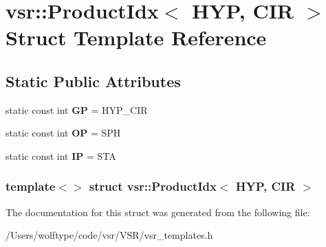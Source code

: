 \hypertarget{structvsr_1_1_product_idx_3_01_h_y_p_00_01_c_i_r_01_4}{\section{vsr\-:\-:Product\-Idx$<$ H\-Y\-P, C\-I\-R $>$ Struct Template Reference}
\label{structvsr_1_1_product_idx_3_01_h_y_p_00_01_c_i_r_01_4}
}
\subsection*{Static Public Attributes}
\begin{DoxyCompactItemize}
\item 
\hypertarget{structvsr_1_1_product_idx_3_01_h_y_p_00_01_c_i_r_01_4_a5ea744484988debd705e119effc78ab4}{static const int {\bfseries G\-P} = H\-Y\-P\-\_\-\-C\-I\-R}\label{structvsr_1_1_product_idx_3_01_h_y_p_00_01_c_i_r_01_4_a5ea744484988debd705e119effc78ab4}

\item 
\hypertarget{structvsr_1_1_product_idx_3_01_h_y_p_00_01_c_i_r_01_4_aad0e473419c17adeec5a79a22331f93b}{static const int {\bfseries O\-P} = S\-P\-H}\label{structvsr_1_1_product_idx_3_01_h_y_p_00_01_c_i_r_01_4_aad0e473419c17adeec5a79a22331f93b}

\item 
\hypertarget{structvsr_1_1_product_idx_3_01_h_y_p_00_01_c_i_r_01_4_a5b9569ce864260fb6b8f3b3bf930583d}{static const int {\bfseries I\-P} = S\-T\-A}\label{structvsr_1_1_product_idx_3_01_h_y_p_00_01_c_i_r_01_4_a5b9569ce864260fb6b8f3b3bf930583d}

\end{DoxyCompactItemize}
\subsubsection*{template$<$$>$ struct vsr\-::\-Product\-Idx$<$ H\-Y\-P, C\-I\-R $>$}



The documentation for this struct was generated from the following file\-:\begin{DoxyCompactItemize}
\item 
/\-Users/wolftype/code/vsr/\-V\-S\-R/vsr\-\_\-templates.\-h\end{DoxyCompactItemize}
